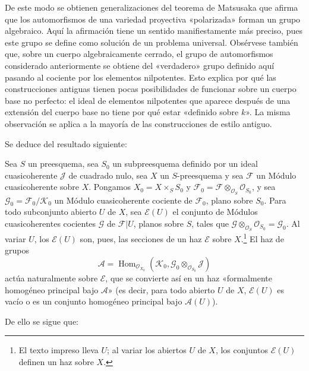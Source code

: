 De este modo se obtienen generalizaciones del teorema de Matsusaka que afirma
que los automorfismos de una variedad proyectiva «polarizada» forman un grupo
algebraico. Aquí la afirmación tiene un sentido manifiestamente más preciso,
pues este grupo se define como solución de un problema universal. Obsérvese
también que, sobre un cuerpo algebraicamente cerrado, el grupo de
automorfismos considerado anteriormente se obtiene del «verdadero» grupo
definido aquí pasando al cociente por los elementos nilpotentes. Esto explica
por qué las construcciones antiguas tienen pocas posibilidades de funcionar
sobre un cuerpo base no perfecto: el ideal de elementos nilpotentes que
aparece después de una extensión del cuerpo base no tiene por qué estar
«definido sobre $k$». La misma observación se aplica a la mayoría de las
construcciones de estilo antiguo.


Se deduce del resultado siguiente:

 Sea $S$ un preesquema, sea $S_0$ un subpreesquema
definido por un ideal cuasicoherente $\mathcal J$ de cuadrado nulo, sea $X$ un
$S$-preesquema y sea $\mathcal F$ un Módulo cuasicoherente sobre $X$. Pongamos
$X_0=X\times_SS_0$ y
$\mathcal F_0=\mathcal F\otimes_{\mathcal O_S}\mathcal O_{S_0}$, y sea
$\mathcal G_0=\mathcal F_0/\mathcal K_0$ un Módulo cuasicoherente cociente de
$\mathcal F_0$, plano sobre $S_0$. Para todo subconjunto abierto $U$ de $X$,
sea $\mathcal E(U)$ el conjunto de Módulos cuasicoherentes cocientes
$\mathcal G$ de $\mathcal F|U$, planos sobre $S$, tales que
$\mathcal G\otimes_{\mathcal O_S}\mathcal O_{S_0}=\mathcal G_0$. Al variar
$U$, los $\mathcal E(U)$ son, pues, las secciones de un haz $\mathcal E$ sobre
$X$.\footnote{El texto impreso lleva $U$; al variar los abiertos $U$ de $X$, los conjuntos $\mathcal E(U)$ definen un haz sobre $X$.} El haz de grupos
\[
\mathcal A=\operatorname{Hom}_{\mathcal O_{X_0}}
(\mathcal K_0,\mathcal G_0\otimes_{\mathcal O_{S_0}}\mathcal J)
\]
actúa naturalmente sobre $\mathcal E$, que se convierte así en un haz
«formalmente homogéneo principal bajo $\mathcal A$» (es decir, para todo
abierto $U$ de $X$, $\mathcal E(U)$ es vacío o es un conjunto homogéneo
principal bajo $\mathcal A(U)$).

De ello se sigue que:

